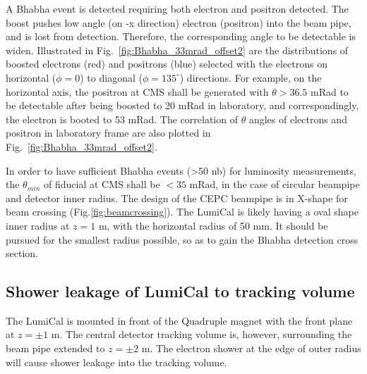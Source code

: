 A Bhabha event is detected requiring both electron and positron detected.
The boost pushes low angle (on -x direction) electron (positron) into the beam pipe,
and is lost from detection. Therefore, the corresponding angle to be detectable is
widen. Illustrated in Fig.~\ref{fig:Bhabha_33mrad_offset2} are the distributions of
boosted electrons (red) and positrons (blue) selected with the electrons
on horizontal ($\phi=0$) to diagonal ($\phi=135^\circ$) directions.
For example, on the horizontal axis, the positron at CMS shall be generated with 
$\theta>36.5$ mRad to be detectable after being boosted to 20 mRad in laboratory,
and correspondingly, the electron is booted to 53 mRad.
The correlation of $\theta$ angles of electrons and positron in laboratory frame
are also plotted in Fig.~\ref{fig:Bhabha_33mrad_offset2}.

In order to have sufficient Bhabha events (>50 nb) for luminosity measurements,
the $\theta_{min}$ of fiducial at CMS shall be $<35 $ mRad, in the case of circular
beampipe and detector inner radius. The design of the CEPC beampipe is in X-shape 
for beam crossing (Fig.\ref{fig:beamcrossing}).
The LumiCal is likely having a oval shape inner radius at $z=1$ m, with the horizontal 
radius of 50 mm. 
It should be pursued for the smallest radius possible,
so as to gain the Bhabha detection cross section.



\subsection{Shower leakage of LumiCal to tracking volume}   %
\label{sec:showerleak} %

The LumiCal is mounted in front of the Quadruple magnet with
the front plane at $z= \pm 1$ m.
The central detector tracking volume is, however, 
surrounding the beam pipe extended to $z= \pm 2$ m. 
The electron shower at the edge of outer radius will cause
shower leakage into the tracking volume.



